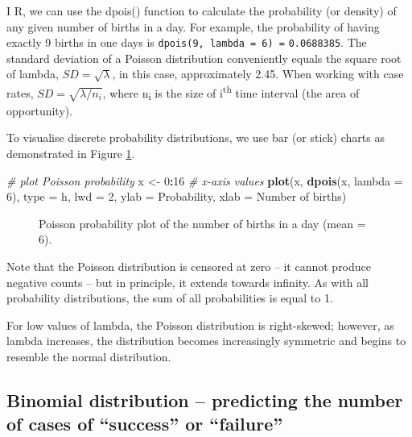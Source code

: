 \documentclass[
]{book}
\makeatletter
\newenvironment{Shaded}{\begin{snugshade}}{\end{snugshade}}
\newcommand{\AttributeTok}[1]{\textcolor[rgb]{0.13,0.29,0.53}{#1}}
\newcommand{\CommentTok}[1]{\textcolor[rgb]{0.56,0.35,0.01}{\textit{#1}}}
\newcommand{\DecValTok}[1]{\textcolor[rgb]{0.00,0.00,0.81}{#1}}
\newcommand{\FunctionTok}[1]{\textcolor[rgb]{0.13,0.29,0.53}{\textbf{#1}}}
\newcommand{\NormalTok}[1]{#1}
\newcommand{\OtherTok}[1]{\textcolor[rgb]{0.56,0.35,0.01}{#1}}
\newcommand{\SpecialCharTok}[1]{\textcolor[rgb]{0.81,0.36,0.00}{\textbf{#1}}}
\newcommand{\StringTok}[1]{\textcolor[rgb]{0.31,0.60,0.02}{#1}}
\newcommand*\pandocbounded[1]{%
  \sbox\pandoc@box{#1}%
  \Gscale@div\@tempa{\textheight}{\dimexpr\ht\pandoc@box+\dp\pandoc@box\relax}%
  \Gscale@div\@tempb{\linewidth}{\wd\pandoc@box}%
  \ifdim\@tempb\p@<\@tempa\p@\let\@tempa\@tempb\fi%
  \ifdim\@tempa\p@<\p@\scalebox{\@tempa}{\usebox\pandoc@box}%
  \else\usebox{\pandoc@box}%
  \fi%
}
\makeatother
\begin{document}
I R, we can use the dpois() function to calculate the probability (or density) of any given number of births in a day. For example, the probability of having exactly 9 births in one days is \texttt{dpois(9,\ lambda\ =\ 6)\ =} \texttt{0.0688385}. The standard deviation of a Poisson distribution conveniently equals the square root of lambda, \(SD = \sqrt{\lambda}\), in this case, approximately 2.45. When working with case rates, \(SD = \sqrt{\lambda / n_i}\), where n\textsubscript{i} is the size of i\textsuperscript{th} time interval (the area of opportunity).

To visualise discrete probability distributions, we use bar (or stick) charts as demonstrated in Figure \ref{fig:stat-dpois}.

\begin{Shaded}
\begin{Highlighting}[]
\CommentTok{\# plot Poisson probability}
\NormalTok{x }\OtherTok{\textless{}{-}} \DecValTok{0}\SpecialCharTok{:}\DecValTok{16} \CommentTok{\# x{-}axis values}
\FunctionTok{plot}\NormalTok{(x, }\FunctionTok{dpois}\NormalTok{(x, }\AttributeTok{lambda =} \DecValTok{6}\NormalTok{), }
     \AttributeTok{type =} \StringTok{\textquotesingle{}h\textquotesingle{}}\NormalTok{,}
     \AttributeTok{lwd  =} \DecValTok{2}\NormalTok{,}
     \AttributeTok{ylab =} \StringTok{\textquotesingle{}Probability\textquotesingle{}}\NormalTok{,}
     \AttributeTok{xlab =} \StringTok{\textquotesingle{}Number of births\textquotesingle{}}\NormalTok{)}
\end{Highlighting}
\end{Shaded}

\begin{figure}
\centering
\pandocbounded{}
\caption{\label{fig:stat-dpois}Poisson probability plot of the number of births in a day (mean = 6).}
\end{figure}

Note that the Poisson distribution is censored at zero -- it cannot produce negative counts -- but in principle, it extends towards infinity. As with all probability distributions, the sum of all probabilities is equal to 1.

For low values of lambda, the Poisson distribution is right-skewed; however, as lambda increases, the distribution becomes increasingly symmetric and begins to resemble the normal distribution.

\subsection{Binomial distribution -- predicting the number of cases of ``success'' or ``failure''}\label{binomial-distribution-predicting-the-number-of-cases-of-success-or-failure}
\end{document}
